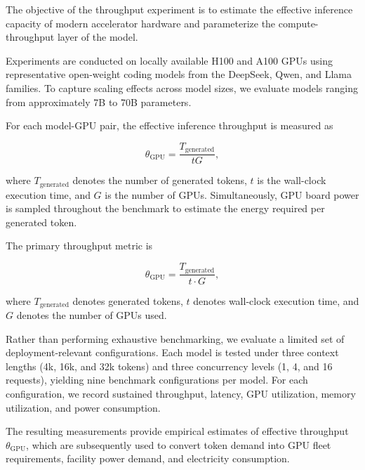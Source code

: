 \documentclass{article}
\begin{document}
The objective of the throughput experiment is to estimate the effective inference capacity of modern accelerator hardware and parameterize the compute-throughput layer of the model.

Experiments are conducted on locally available H100 and A100 GPUs using representative open-weight coding models from the DeepSeek, Qwen, and Llama families. To capture scaling effects across model sizes, we evaluate models ranging from approximately 7B to 70B parameters.

For each model-GPU pair, the effective inference throughput is measured as

\begin{equation}
\theta_{\mathrm{GPU}}
=
\frac{T_{\mathrm{generated}}}
{tG},
\end{equation}

where $T_{\mathrm{generated}}$ denotes the number of generated tokens, $t$ is the wall-clock execution time, and $G$ is the number of GPUs. Simultaneously, GPU board power is sampled throughout the benchmark to estimate the energy required per generated token.

The primary throughput metric is

\begin{equation}
\theta_{\mathrm{GPU}} = \frac{T_{\mathrm{generated}}}
{t \cdot G},
\end{equation}

where $T_{\mathrm{generated}}$ denotes generated tokens, $t$ denotes wall-clock execution time, and $G$ denotes the number of GPUs used.

Rather than performing exhaustive benchmarking, we evaluate a limited set of deployment-relevant configurations. Each model is tested under three context lengths (4k, 16k, and 32k tokens) and three concurrency levels (1, 4, and 16 requests), yielding nine benchmark configurations per model. For each configuration, we record sustained throughput, latency, GPU utilization, memory utilization, and power consumption.

The resulting measurements provide empirical estimates of effective throughput $\theta_{\mathrm{GPU}}$, which are subsequently used to convert token demand into GPU fleet requirements, facility power demand, and electricity consumption.
\end{document}
